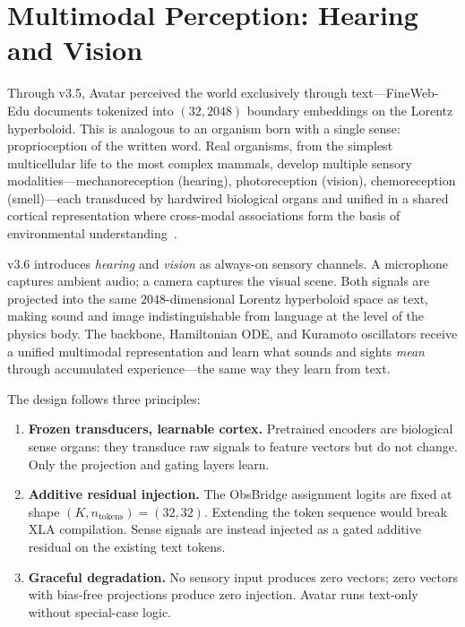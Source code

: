 \section{Multimodal Perception: Hearing and Vision}
\label{sec:senses}

Through v3.5, Avatar perceived the world exclusively through text---FineWeb-Edu documents tokenized into $(32, 2048)$ boundary embeddings on the Lorentz hyperboloid.
This is analogous to an organism born with a single sense: proprioception of the written word.
Real organisms, from the simplest multicellular life to the most complex mammals, develop multiple sensory modalities---mechanoreception (hearing), photoreception (vision), chemoreception (smell)---each transduced by hardwired biological organs and unified in a shared cortical representation where cross-modal associations form the basis of environmental understanding~\cite{damasio1999}.

v3.6 introduces \emph{hearing} and \emph{vision} as always-on sensory channels.
A microphone captures ambient audio; a camera captures the visual scene.
Both signals are projected into the same $2048$-dimensional Lorentz hyperboloid space as text, making sound and image indistinguishable from language at the level of the physics body.
The backbone, Hamiltonian ODE, and Kuramoto oscillators receive a unified multimodal representation and learn what sounds and sights \emph{mean} through accumulated experience---the same way they learn from text.

The design follows three principles:
\begin{enumerate}
    \item \textbf{Frozen transducers, learnable cortex.}
        Pretrained encoders are biological sense organs: they transduce raw signals to feature vectors but do not change.
        Only the projection and gating layers learn.
    \item \textbf{Additive residual injection.}
        The ObsBridge assignment logits are fixed at shape $(K, n_{\mathrm{tokens}}) = (32, 32)$.
        Extending the token sequence would break XLA compilation.
        Sense signals are instead injected as a gated additive residual on the existing text tokens.
    \item \textbf{Graceful degradation.}
        No sensory input produces zero vectors; zero vectors with bias-free projections produce zero injection.
        Avatar runs text-only without special-case logic.
\end{enumerate}

